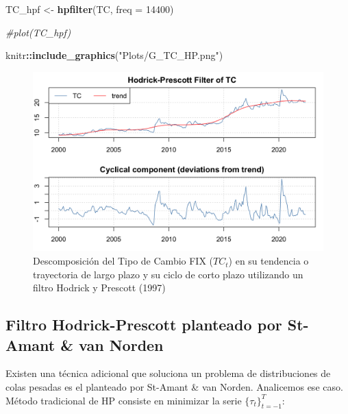 \documentclass[
]{book}
\newenvironment{Shaded}{\begin{snugshade}}{\end{snugshade}}
\newcommand{\AttributeTok}[1]{\textcolor[rgb]{0.13,0.29,0.53}{#1}}
\newcommand{\CommentTok}[1]{\textcolor[rgb]{0.56,0.35,0.01}{\textit{#1}}}
\newcommand{\DecValTok}[1]{\textcolor[rgb]{0.00,0.00,0.81}{#1}}
\newcommand{\FunctionTok}[1]{\textcolor[rgb]{0.13,0.29,0.53}{\textbf{#1}}}
\newcommand{\NormalTok}[1]{#1}
\newcommand{\OtherTok}[1]{\textcolor[rgb]{0.56,0.35,0.01}{#1}}
\newcommand{\SpecialCharTok}[1]{\textcolor[rgb]{0.81,0.36,0.00}{\textbf{#1}}}
\newcommand{\StringTok}[1]{\textcolor[rgb]{0.31,0.60,0.02}{#1}}
\begin{document}
\begin{Shaded}
\begin{Highlighting}[]
\NormalTok{TC\_hpf }\OtherTok{\textless{}{-}} \FunctionTok{hpfilter}\NormalTok{(TC, }\AttributeTok{freq =} \DecValTok{14400}\NormalTok{)}

\CommentTok{\#plot(TC\_hpf)}

\NormalTok{knitr}\SpecialCharTok{::}\FunctionTok{include\_graphics}\NormalTok{(}\StringTok{"Plots/G\_TC\_HP.png"}\NormalTok{) }
\end{Highlighting}
\end{Shaded}

\begin{figure}

{\centering \includegraphics[width=0.95\linewidth]{Plots/G_TC_HP} 

}

\caption{Descomposición del Tipo de Cambio FIX ($TC_t$) en su tendencia o trayectoria de largo plazo y su ciclo de corto plazo utilizando un filtro Hodrick y Prescott (1997)}\label{fig:fig53}
\end{figure}

\hypertarget{filtro-hodrick-prescott-planteado-por-st-amant-van-norden}{%
\subsection{Filtro Hodrick-Prescott planteado por St-Amant \& van Norden}\label{filtro-hodrick-prescott-planteado-por-st-amant-van-norden}}

Existen una técnica adicional que soluciona un problema de distribuciones de colas pesadas es el planteado por St-Amant \& van Norden. Analicemos ese caso. Método tradicional de HP consiste en minimizar la serie \(\{ \tau_t \}_{t=-1}^T\):
\end{document}
